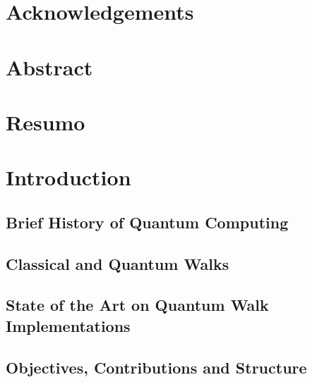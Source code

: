 \documentclass[
oneside,
11pt, a4paper,
footinclude=true,
headinclude=true,
cleardoublepage=empty
]{scrbook}
\author{Jaime Pereira Santos}
\date{\myear} %
\begin{document}
\umfrontcover	
\umtitlepage

\chapter*{Acknowledgements}


\chapter*{Abstract}


\cleardoublepage
\chapter*{Resumo}


\tableofcontents
\listoffigures
\listoftables



\chapter{Introduction}\label{chap:introduction}

\section{Brief History of Quantum Computing}\label{sec:historyQC}

\section{Classical and Quantum Walks}\label{sec:classicalandquantumwalks}

\section{State of the Art on Quantum Walk Implementations}\label{sec:stateart}

\section{Objectives, Contributions and Structure}\label{sec:contrib}

\end{document}
